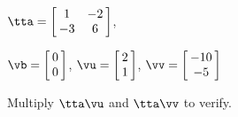{$\tta = \left[\hskip -3pt \begin{array}{cc} 1&-2\\   -3&6 \end{array}\hskip -3pt \right] $, 

$\vb=\left[\hskip -3pt \begin{array}{c} 0\\   0 \end{array}\hskip -3pt \right] $, 
$\vu = \left[\hskip -3pt \begin{array}{c} 2\\ 1 \end{array}\hskip -3pt \right]$, $\vv = \left[\hskip -3pt \begin{array}{c} -10\\ -5 \end{array}\hskip -3pt \right]$ }
{Multiply $\tta\vu$ and $\tta\vv$ to verify.}




